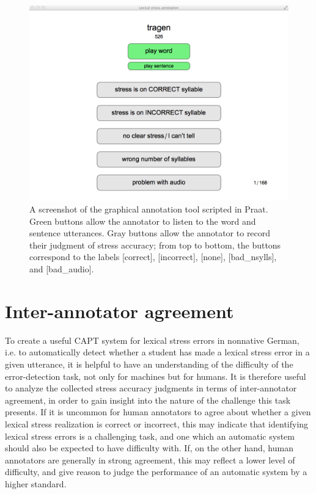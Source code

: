 		\begin{figure}[bht]
			\centering
			\includegraphics[width=\textwidth]{img/screenshots/AnnotationTool}
			\caption[A screenshot of the graphical annotation tool scripted in Praat.]{A screenshot of the graphical annotation tool scripted in Praat. Green buttons allow the annotator to listen to  the word and sentence utterances. Gray buttons allow the annotator to record their judgment of stress accuracy; from top to bottom, the buttons correspond to the labels [correct], [incorrect], [none], [bad\_nsylls], and [bad\_audio]. }
			\label{fig:annotationtool}
		\end{figure}
		
		
	
	\section{Inter-annotator agreement}
	\label{sec:lexstress:agreement}	
	
	To create a useful CAPT system for lexical stress errors in nonnative German, i.e. to automatically detect whether a student has made a lexical stress error in a given utterance, it is helpful to have an understanding of the difficulty of the error-detection task, not only for machines but for humans. It is therefore useful to analyze the collected stress accuracy judgments in terms of inter-annotator agreement, in order to gain insight into the nature of the challenge this task presents. If it is uncommon for human annotators to agree about whether a given lexical stress realization is correct or incorrect, this may indicate that  identifying lexical stress errors is a challenging task, and one which an automatic system should also be expected to have difficulty with. If, on the other hand, human annotators are generally in strong agreement, this may reflect a lower level of difficulty, and give reason to judge the performance of an automatic system by a higher standard.  
	
